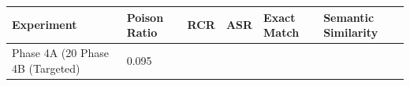 \begin{tabular}{llllll}
\toprule
Experiment & Poison Ratio & RCR & ASR & Exact Match & Semantic Similarity \\
\midrule
Phase 4A (20%
Phase 4B (Targeted) & 0.095%
\bottomrule
\end{tabular}
